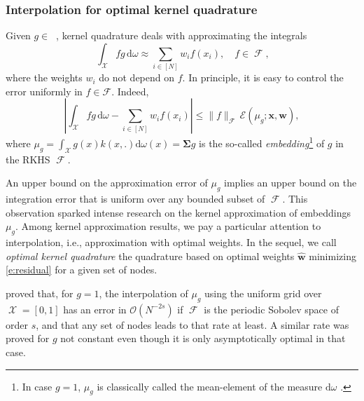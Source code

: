 \documentclass[twoside,11pt]{book}
\numberwithin{theorem}{chapter}
\numberwithin{definition}{chapter}
\numberwithin{proposition}{chapter}
\numberwithin{corollary}{chapter}
\numberwithin{example}{chapter}
\numberwithin{lemma}{chapter}
\DeclareMathOperator{\F}{\mathcal{F}}
\DeclareMathOperator{\X}{\mathcal{X}}
\DeclareMathOperator{\Ltwo}{\mathbb{L}_{2}(\mathrm{d} \omega)}
\newcommand{\rb}[1]{\textcolor{magenta}{#1}}
\begin{document}
\subsubsection{Interpolation for optimal kernel quadrature}\label{sec:review_optimal_kernel_quadrature}

Given $g \in \Ltwo$, kernel quadrature deals with approximating the integrals
\begin{equation}
\:\int_{\X} fg \,\mathrm{d}\omega \approx \sum\limits_{i \in [N]} w_{i}f(x_{i}),\quad f\in\F,
\end{equation}
where the weights $w_{i}$ do not depend on $f$.
In principle, it is easy to control the error uniformly in $f\in\mathcal{F}$. Indeed,
\begin{equation}\label{eq:upper_bound_integration_error}
\left| \int_{\X} fg \,\mathrm{d}\omega - \sum_{i \in [N]} w_{i}f(x_{i})\right| \leq \|f\|_{\F} \, \mathcal{E}(\mu_{g};\bm{x},\bm{w}),
\end{equation}
where
$ \displaystyle
\mu_{g} = \int_{\X}g(x)k(x,.) \mathrm{d}\omega(x){=\bm{\Sigma} g}
$
is the so-called \emph{embedding}\footnote{In case $g =1$, $\mu_{g}$ is classically called the mean-element of the measure $\mathrm{d} \omega$ \citep{SmGrSoSc07}.} of $g$ in the RKHS $\F$.

An upper bound on the approximation error of $\mu_{g}$ implies an upper bound on the integration error that is uniform over any bounded subset of $\F$. This observation sparked intense research on the kernel approximation of embeddings $\mu_{g}$. Among kernel approximation results, we pay a particular attention to interpolation, i.e., approximation with optimal weights. In the sequel, we call \emph{optimal kernel quadrature} the quadrature based on optimal weights $\hat{\bm{w}}$ minimizing \eqref{e:residual} for a given set of nodes.

\cite{Boj81} proved that, for $g=1$, the interpolation of $\mu_{g}$ using the uniform grid over $\X = [0,1]$ has an error in $\mathcal{O}(N^{-2s})$ if $\F$ is the periodic Sobolev space of order $s$, and that any set of nodes leads to that rate at least. A similar rate was proved for $g$ not constant \citep{NoUlWo15} even though it is only asymptotically optimal in that case.
\end{document}
